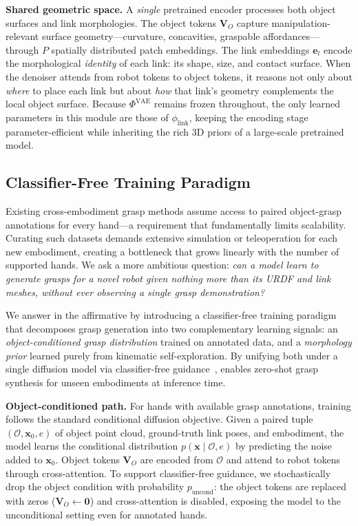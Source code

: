 \noindent\textbf{Shared geometric space.}
A \emph{single} pretrained encoder processes both object surfaces and link morphologies.
The object tokens $\mathbf{V}_O$ capture manipulation-relevant surface geometry---curvature, concavities, graspable affordances---through $P$ spatially distributed patch embeddings.
The link embeddings $\mathbf{e}_l$ encode the morphological \emph{identity} of each link: its shape, size, and contact surface.
When the denoiser attends from robot tokens to object tokens, it reasons not only about \emph{where} to place each link but about \emph{how} that link's geometry complements the local object surface.
Because $\Phi^\text{VAE}$ remains frozen throughout, the only learned parameters in this module are those of $\phi_\text{link}$, keeping the encoding stage parameter-efficient while inheriting the rich 3D priors of a large-scale pretrained model.

\subsection{Classifier-Free Training Paradigm}
\label{sec:classifier_free}

Existing cross-embodiment grasp methods assume access to paired object-grasp annotations for every hand---a requirement that fundamentally limits scalability.
Curating such datasets demands extensive simulation or teleoperation for each new embodiment, creating a bottleneck that grows linearly with the number of supported hands.
We ask a more ambitious question: \emph{can a model learn to generate grasps for a novel robot given nothing more than its URDF and link meshes, without ever observing a single grasp demonstration?}

We answer in the affirmative by introducing a classifier-free training paradigm that decomposes grasp generation into two complementary learning signals: an \emph{object-conditioned grasp distribution} trained on annotated data, and a \emph{morphology prior} learned purely from kinematic self-exploration.
By unifying both under a single diffusion model via classifier-free guidance~\cite{ho2022classifierfree}, \modelname enables zero-shot grasp synthesis for unseen embodiments at inference time.

\noindent\textbf{Object-conditioned path.}
For hands with available grasp annotations, training follows the standard conditional diffusion objective.
Given a paired tuple $(\mathcal{O}, \mathbf{x}_0, e)$ of object point cloud, ground-truth link poses, and embodiment, the model learns the conditional distribution $p(\mathbf{x} \mid \mathcal{O}, e)$ by predicting the noise added to $\mathbf{x}_0$.
Object tokens $\mathbf{V}_O$ are encoded from $\mathcal{O}$ and attend to robot tokens through cross-attention.
To support classifier-free guidance, we stochastically drop the object condition with probability $p_\text{uncond}$: the object tokens are replaced with zeros ($\mathbf{V}_O \leftarrow \mathbf{0}$) and cross-attention is disabled, exposing the model to the unconditional setting even for annotated hands.

